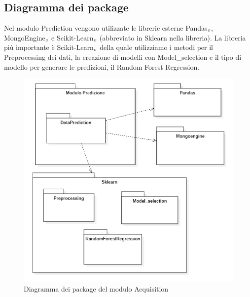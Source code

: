 \subsection{Diagramma dei package}\label{ArchitetturaDelProdottoArchitetturaModuloPredictionDiagrammaDeiPackage}
Nel modulo Prediction vengono utilizzate le librerie esterne Pandas$_{\scaleto{G}{3pt}}$, MongoEngine$_{\scaleto{G}{3pt}}$ e Scikit-Learn$_{\scaleto{G}{3pt}}$ (abbreviato in Sklearn nella libreria). La libreria più importante è Scikit-Learn$_{\scaleto{G}{3pt}}$ della quale utilizziamo i metodi per il Preprocessing dei dati, la creazione di modelli con Model\_selection e il tipo di modello per generare le predizioni, il Random Forest Regression.
\begin{figure}[H]
  \begin{center}
    \includegraphics[scale=0.8]{../immagini/diag_PB/diag_pack_pred.png}
    \caption{Diagramma dei package del modulo Acquisition}
  \end{center}
\end{figure}


